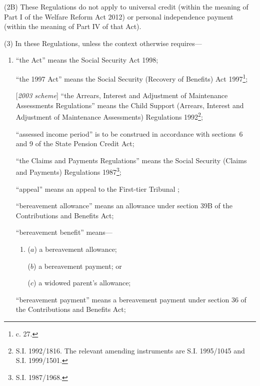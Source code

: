 \documentclass[12pt,a4paper]{article}
\begin{document}
(2B) These Regulations do not apply to universal credit (within the meaning of Part I of the Welfare Reform Act 2012) or personal independence payment (within the meaning of Part IV of that Act).

(3) In these Regulations, unless the context otherwise requires—
\begin{enumerate}\item[]
“the Act” means the Social Security Act 1998;

“the 1997 Act” means the Social Security (Recovery of Benefits) Act 1997\footnote{ c. 27.};

[\emph{2003 scheme}] “the Arrears, Interest and Adjustment of Maintenance Assessments Regulations” means the Child Support (Arrears, Interest and Adjustment of Maintenance Assessments) Regulations 1992\footnote{\frenchspacing S.I. 1992/1816. The relevant amending instruments are S.I. 1995/1045 and S.I. 1999/1501.};

“assessed income period” is to be construed in accordance with sections~6 and 9 of the State Pension Credit Act;

“the Claims and Payments Regulations” means the Social Security (Claims and Payments) Regulations 1987\footnote{\frenchspacing S.I. 1987/1968.};

“appeal” means an appeal to 
the First-tier Tribunal%
;

“bereavement allowance” means an allowance under section 39B of the Contributions and Benefits Act;

“bereavement benefit” means—
\begin{enumerate}\item[]
($a$)
a bereavement allowance;

($b$)
a bereavement payment; or

($c$)
a widowed parent’s allowance;
\end{enumerate}

“bereavement payment” means a bereavement payment under section 36 of the Contributions and Benefits Act;


\end{enumerate}
\end{document}
